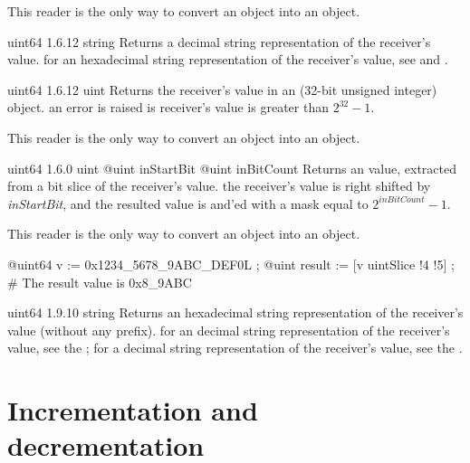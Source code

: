 This reader is the only way to convert an  object into an  object.


{uint64}
{1.6.12}
{string}
{Returns a decimal string representation of the receiver's value.}
{for an hexadecimal string representation of the receiver's value, see  and .}



{uint64}
{1.6.12}
{uint}
{Returns the receiver's value in an  (32-bit unsigned integer) object.}
{an error is raised is receiver's value is greater than $2^{32}-1$.}

This reader is the only way to convert an  object into an  object.


{uint64}
{1.6.0}
{uint}
{@uint inStartBit}
{@uint inBitCount}
{Returns an  value, extracted from a bit slice of the receiver's value.}
{the receiver's value is right shifted by \emph{inStartBit}, and the resulted value is and'ed with a mask equal to $2^{inBitCount}-1$.}

This reader is the only way to convert an  object into an  object.


\exempleDeuxLignes
{}
{@uint64 v := 0x1234\_5678\_9ABC\_DEF0L ;}
{@uint result := [v uintSlice !4 !5] ; \# The result value is 0x8\_9ABC}





{uint64}
{1.9.10}
{string}
{Returns an hexadecimal string representation of the receiver's value (without any prefix).}
{for an decimal string representation of the receiver's value, see the ; for a decimal string representation of the receiver's value, see the .}






\section{Incrementation and decrementation}

